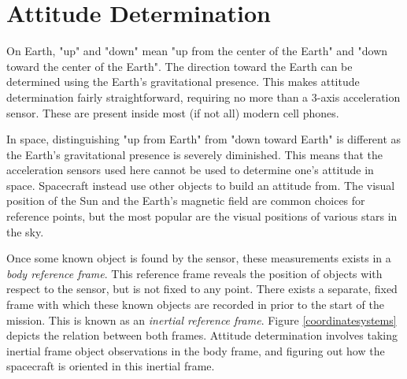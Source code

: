 \section{Attitude Determination}
On Earth, "up" and "down" mean "up from the center of the Earth" and "down toward the center of the Earth". The direction toward the Earth can be determined using the Earth's gravitational presence. This makes attitude determination fairly straightforward, requiring no more than a 3-axis acceleration sensor. These are present inside most (if not all) modern cell phones. 

In space, distinguishing "up from Earth" from "down toward Earth" is different as the Earth's gravitational presence is severely diminished. This means that the acceleration sensors used here cannot be used to determine one's attitude in space. Spacecraft instead use other objects to build an attitude from. The visual position of the Sun and the Earth's magnetic field are common choices for reference points, but the most popular are the visual positions of various stars in the sky. 

Once some known object is found by the sensor, these measurements exists in a \textit{body reference frame}. This reference frame reveals the position of objects with respect to the sensor, but is not fixed to any point. There exists a separate, fixed frame with which these known objects are recorded in prior to the start of the mission. This is known as an \textit{inertial reference frame}. Figure \eqref{coordinatesystems} depicts the relation between both frames. Attitude determination involves taking inertial frame object observations in the body frame, and figuring out how the spacecraft is oriented in this inertial frame. 

